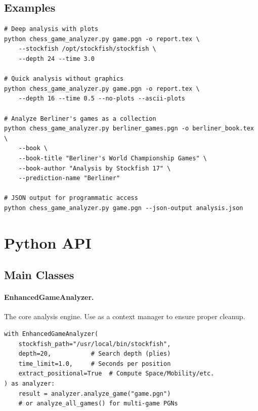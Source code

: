 \documentclass[12pt]{book}
\begin{document}
\subsection{Examples}

\begin{verbatim}
# Deep analysis with plots
python chess_game_analyzer.py game.pgn -o report.tex \
    --stockfish /opt/stockfish/stockfish \
    --depth 24 --time 3.0

# Quick analysis without graphics
python chess_game_analyzer.py game.pgn -o report.tex \
    --depth 16 --time 0.5 --no-plots --ascii-plots

# Analyze Berliner's games as a collection
python chess_game_analyzer.py berliner_games.pgn -o berliner_book.tex \
    --book \
    --book-title "Berliner's World Championship Games" \
    --book-author "Analysis by Stockfish 17" \
    --prediction-name "Berliner"

# JSON output for programmatic access
python chess_game_analyzer.py game.pgn --json-output analysis.json
\end{verbatim}

\section{Python API}

\subsection{Main Classes}

\paragraph{EnhancedGameAnalyzer.}
The core analysis engine. Use as a context manager to ensure proper cleanup.

\begin{verbatim}
with EnhancedGameAnalyzer(
    stockfish_path="/usr/local/bin/stockfish",
    depth=20,           # Search depth (plies)
    time_limit=1.0,     # Seconds per position
    extract_positional=True  # Compute Space/Mobility/etc.
) as analyzer:
    result = analyzer.analyze_game("game.pgn")
    # or analyze_all_games() for multi-game PGNs
\end{verbatim}
\end{document}
